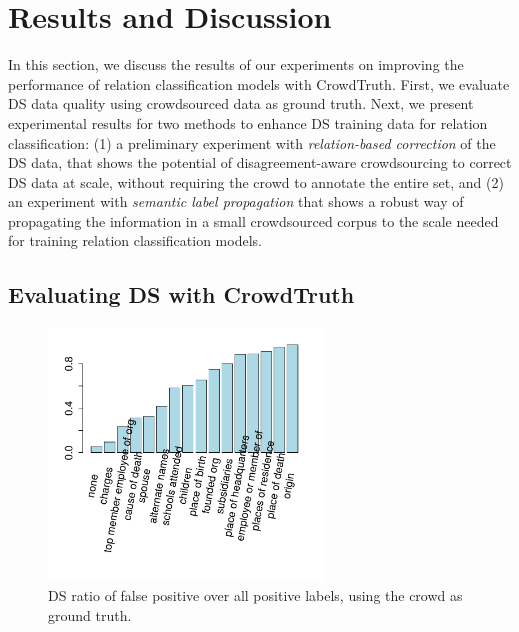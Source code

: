 

\section{Results and Discussion}

In this section, we discuss the results of our experiments on improving the performance of relation classification models with CrowdTruth. First, we evaluate DS data quality using crowdsourced data as ground truth. Next, we present experimental results for two methods to enhance DS training data for relation classification: (1) a preliminary experiment with \textit{relation-based correction} of the DS data, that shows the potential of disagreement-aware crowdsourcing to correct DS data at scale, without requiring the crowd to annotate the entire set, and (2) an experiment with \textit{semantic label propagation} that shows a robust way of propagating the information in a small crowdsourced corpus to the scale needed for training relation classification models.


\subsection{Evaluating DS with CrowdTruth}
\label{sec:ds-eval}

\begin{figure}[htb!]
\centering
\includegraphics[width=0.65\textwidth]{img/fp_ratio.pdf}
\caption{DS ratio of false positive over all positive labels, using the crowd as ground truth.}
\label{fig:fp_rate}
\end{figure}

